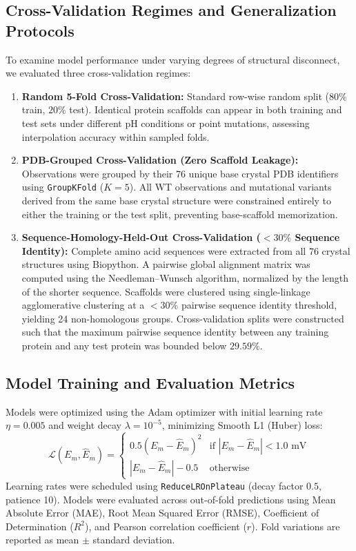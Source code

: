 \documentclass[journal=jcisd8,manuscript=article]{achemso}
\begin{document}
\subsection{Cross-Validation Regimes and Generalization Protocols}
To examine model performance under varying degrees of structural disconnect, we evaluated three cross-validation regimes:
\begin{enumerate}
    \item \textbf{Random 5-Fold Cross-Validation:} Standard row-wise random split ($80\%$ train, $20\%$ test). Identical protein scaffolds can appear in both training and test sets under different pH conditions or point mutations, assessing interpolation accuracy within sampled folds.
    \item \textbf{PDB-Grouped Cross-Validation (Zero Scaffold Leakage):} Observations were grouped by their 76 unique base crystal PDB identifiers using \texttt{GroupKFold} ($K=5$). All WT observations and mutational variants derived from the same base crystal structure were constrained entirely to either the training or the test split, preventing base-scaffold memorization.
    \item \textbf{Sequence-Homology-Held-Out Cross-Validation ($<30\%$ Sequence Identity):} Complete amino acid sequences were extracted from all 76 crystal structures using Biopython.\cite{cock2009biopython} A pairwise global alignment matrix was computed using the Needleman--Wunsch algorithm,\cite{walsh2021dome,alquraishi2019proteinnet} normalized by the length of the shorter sequence. Scaffolds were clustered using single-linkage agglomerative clustering at a $<30\%$ pairwise sequence identity threshold, yielding 24 non-homologous groups. Cross-validation splits were constructed such that the maximum pairwise sequence identity between any training protein and any test protein was bounded below $29.59\%$.
\end{enumerate}

\subsection{Model Training and Evaluation Metrics}
Models were optimized using the Adam optimizer with initial learning rate $\eta = 0.005$ and weight decay $\lambda = 10^{-5}$, minimizing Smooth L1 (Huber) loss:
\begin{equation}
\mathcal{L}(E_m, \widehat{E}_m) = \begin{cases}
0.5 (E_m - \widehat{E}_m)^2 & \text{if } |E_m - \widehat{E}_m| < 1.0\text{ mV} \\
|E_m - \widehat{E}_m| - 0.5 & \text{otherwise}
\end{cases}
\end{equation}
Learning rates were scheduled using \texttt{ReduceLROnPlateau} (decay factor $0.5$, patience 10). Models were evaluated across out-of-fold predictions using Mean Absolute Error (MAE), Root Mean Squared Error (RMSE), Coefficient of Determination ($R^2$), and Pearson correlation coefficient ($r$). Fold variations are reported as mean $\pm$ standard deviation. 
\end{document}
